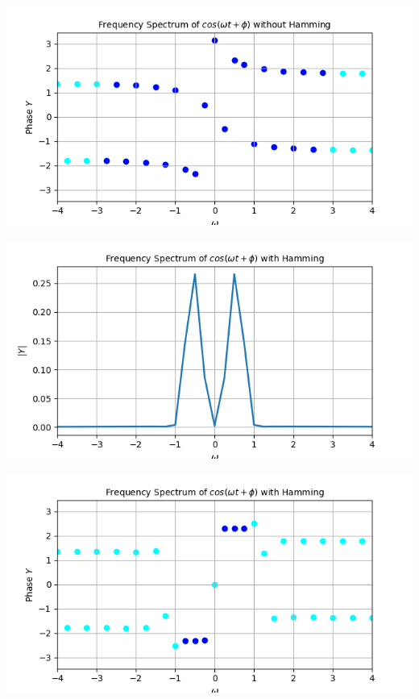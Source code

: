 \documentclass[12pt, a4paper]{report}
\begin{document}
\begin{center}
	\includegraphics[scale=0.8]{Figure_15.png} 
	\label{fig:rawdata}
\end{center}

\begin{center}
	\includegraphics[scale=0.8]{Figure_16.png} 
	\label{fig:rawdata}
\end{center}

\begin{center}
	\includegraphics[scale=0.8]{Figure_17.png} 
	\label{fig:rawdata}
\end{center}
\clearpage
\end{document}
